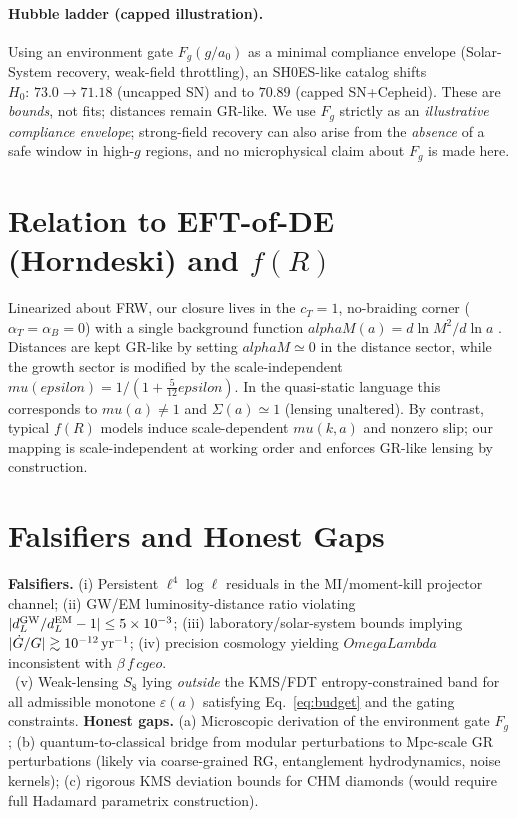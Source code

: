 \documentclass[aps,prd,onecolumn,superscriptaddress,nofootinbib]{revtex4-2}
\def\OmL{OmegaLambda}%
\def\cgeo{cgeo}%
\def\alphaM{alphaM}%
\def\eps{epsilon}%
\def\mu{mu}%
\def\alpha{alpha}%
\def\alpha_M{alphaM}%
\def\Omega_\Lambda{OmegaLambda}%
\providecommand{\OmL}{\Omega_\Lambda}
\providecommand{\cgeo}{c_{\rm geo}}
\providecommand{\alphaM}{\alpha_M}
\providecommand{\eps}{\varepsilon}
\begin{document}
\paragraph{Hubble ladder (capped illustration).} Using an environment gate \(F_g(g/a_0)\) as a minimal compliance envelope (Solar-System recovery, weak-field throttling), an SH0ES-like catalog shifts \(H_0\!:\,73.0\to 71.18\) (uncapped SN) and to \(70.89\) (capped SN+Cepheid). These are \emph{bounds}, not fits; distances remain GR-like. We use \(F_g\) strictly as an \emph{illustrative compliance envelope}; strong-field recovery can also arise from the \emph{absence} of a safe window in high-\(g\) regions, and no microphysical claim about \(F_g\) is made here.

\section{Relation to EFT-of-DE (Horndeski) and \texorpdfstring{$f(R)$}{f(R)}}
\label{sec:eft}
Linearized about FRW, our closure lives in the \(c_T=1\), no-braiding corner (\(\alpha_T=\alpha_B=0\)) with a single background function \(\alphaM(a)=d\ln M^2/d\ln a\) \cite{BelliniSawicki2014}. Distances are kept GR-like by setting \(\alphaM\simeq 0\) in the distance sector, while the growth sector is modified by the scale-independent \(\mu(\eps)=1/(1+\tfrac{5}{12}\eps)\). In the quasi-static language this corresponds to \(\mu(a)\neq 1\) and \(\Sigma(a)\simeq 1\) (lensing unaltered). By contrast, typical \(f(R)\) models induce scale-dependent \(\mu(k,a)\) and nonzero slip; our mapping is scale-independent at working order and enforces GR-like lensing by construction.

\section{Falsifiers and Honest Gaps}
\label{sec:falsifiers}
\textbf{Falsifiers.} (i) Persistent \(\ell^4\log\ell\) residuals in the MI/moment-kill projector channel; (ii) GW/EM luminosity-distance ratio violating \(|d_L^{\rm GW}/d_L^{\rm EM}-1|\le 5\times 10^{-3}\); (iii) laboratory/solar-system bounds implying \(|\dot G/G|\gtrsim 10^{-12}\,{\rm yr}^{-1}\); (iv) precision cosmology yielding \(\OmL\) inconsistent with \(\beta\,f\,\cgeo\).\\
\ (v) Weak-lensing \(S_8\) lying \emph{outside} the KMS/FDT entropy-constrained band for all admissible monotone \(\varepsilon(a)\) satisfying Eq.~\eqref{eq:budget} and the gating constraints.
\textbf{Honest gaps.} (a) Microscopic derivation of the environment gate \(F_g\); (b) quantum-to-classical bridge from modular perturbations to Mpc-scale GR perturbations (likely via coarse-grained RG, entanglement hydrodynamics, noise kernels); (c) rigorous KMS deviation bounds for CHM diamonds (would require full Hadamard parametrix construction).
\end{document}
